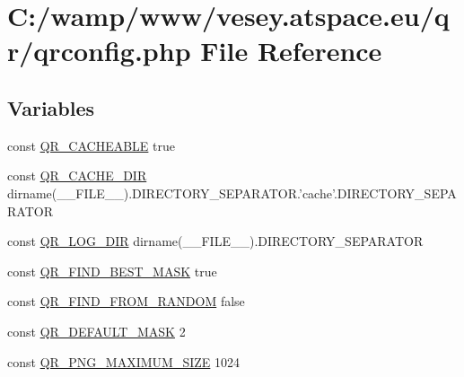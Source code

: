 \hypertarget{qrconfig_8php}{\section{C\-:/wamp/www/vesey.atspace.\-eu/qr/qrconfig.php File Reference}
\label{qrconfig_8php}
}
\subsection*{Variables}
\begin{DoxyCompactItemize}
\item 
const \hyperlink{qrconfig_8php_a2e289dc15e8d9d0c93bcb589e2e4fa7f}{Q\-R\-\_\-\-C\-A\-C\-H\-E\-A\-B\-L\-E} true
\item 
const \hyperlink{qrconfig_8php_a30bc15179f940c7cefe147c7c10d21d2}{Q\-R\-\_\-\-C\-A\-C\-H\-E\-\_\-\-D\-I\-R} dirname(\-\_\-\-\_\-\-F\-I\-L\-E\-\_\-\-\_\-).D\-I\-R\-E\-C\-T\-O\-R\-Y\-\_\-\-S\-E\-P\-A\-R\-A\-T\-O\-R.'cache'.D\-I\-R\-E\-C\-T\-O\-R\-Y\-\_\-\-S\-E\-P\-A\-R\-A\-T\-O\-R
\item 
const \hyperlink{qrconfig_8php_a31f4c0eeeec4e117adbfb95bdc0b34cc}{Q\-R\-\_\-\-L\-O\-G\-\_\-\-D\-I\-R} dirname(\-\_\-\-\_\-\-F\-I\-L\-E\-\_\-\-\_\-).D\-I\-R\-E\-C\-T\-O\-R\-Y\-\_\-\-S\-E\-P\-A\-R\-A\-T\-O\-R
\item 
const \hyperlink{qrconfig_8php_af4ec4aec5be16e8785674055683659e6}{Q\-R\-\_\-\-F\-I\-N\-D\-\_\-\-B\-E\-S\-T\-\_\-\-M\-A\-S\-K} true
\item 
const \hyperlink{qrconfig_8php_a4a3b50c407bbdf7ffa1197a666947bec}{Q\-R\-\_\-\-F\-I\-N\-D\-\_\-\-F\-R\-O\-M\-\_\-\-R\-A\-N\-D\-O\-M} false
\item 
const \hyperlink{qrconfig_8php_ad558bfb85d8139a05d1d663579be938b}{Q\-R\-\_\-\-D\-E\-F\-A\-U\-L\-T\-\_\-\-M\-A\-S\-K} 2
\item 
const \hyperlink{qrconfig_8php_a45b4274e494e9533fab417bc0aa0eb2a}{Q\-R\-\_\-\-P\-N\-G\-\_\-\-M\-A\-X\-I\-M\-U\-M\-\_\-\-S\-I\-Z\-E} 1024
\end{DoxyCompactItemize}


